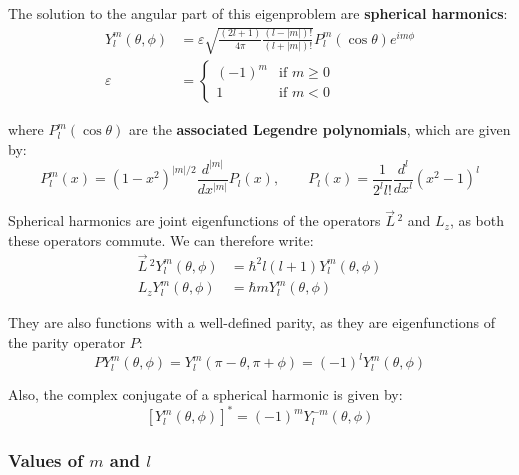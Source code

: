 The solution to the angular part of this eigenproblem are \textbf{spherical harmonics}:
\begin{equation}
    \begin{split}
        Y_l^m(\theta, \phi) &= \varepsilon\sqrt{\frac{(2l+1)}{4\pi}\frac{(l-|m|)!}{(l+|m|)!}}P_l^m(\cos\theta)e^{im\phi} \\
        \varepsilon &= \begin{cases}
            (-1)^m & \text{if } m \geq 0 \\
            1 & \text{if } m < 0
        \end{cases}
    \end{split}
\end{equation}

where $P_l^m(\cos\theta)$ are the \textbf{associated Legendre polynomials}, which are given by:
\begin{equation}
    P_l^m(x) = (1-x^2)^{|m|/2}\frac{d^{|m|}}{dx^{|m|}}P_l(x), \qquad P_l(x) = \frac{1}{2^ll!}\frac{d^l}{dx^l}(x^2-1)^l
\end{equation}

Spherical harmonics are joint eigenfunctions of the operators $\vec{L}\,^2$ and $L_z$, as both these operators commute. We can therefore write:
\begin{equation} \label{spherical_eig_eqn}
    \begin{split}
        \vec{L}\,^2Y_l^m(\theta, \phi) &= \hbar^2l(l+1)Y_l^m(\theta, \phi) \\
        L_zY_l^m(\theta, \phi) &= \hbar mY_l^m(\theta, \phi)
    \end{split}
\end{equation}


They are also functions with a well-defined parity, as they are eigenfunctions of the parity operator $P$:
\begin{equation}
    PY_l^m(\theta, \phi) = Y_l^m(\pi-\theta, \pi+\phi) = (-1)^lY_l^m(\theta, \phi)
\end{equation}

Also, the complex conjugate of a spherical harmonic is given by:
\begin{equation}
    \left[Y_l^{m}(\theta, \phi)\right]^* = (-1)^mY_l^{-m}(\theta, \phi)
\end{equation}

\subsubsection{Values of $m$ and $l$}

